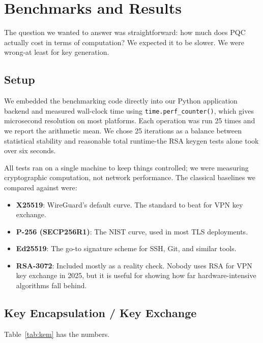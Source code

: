 \documentclass[10pt, conference, letterpaper]{IEEEtran}
\begin{document}
\section{Benchmarks and Results}
The question we wanted to answer was straightforward: how much does PQC actually cost in terms of computation? We expected it to be slower. We were wrong-at least for key generation.

\subsection{Setup}
We embedded the benchmarking code directly into our Python application backend and measured wall-clock time using \texttt{time.perf\_counter()}, which gives microsecond resolution on most platforms. Each operation was run 25 times and we report the arithmetic mean. We chose 25 iterations as a balance between statistical stability and reasonable total runtime-the RSA keygen tests alone took over six seconds.

All tests ran on a single machine to keep things controlled; we were measuring cryptographic computation, not network performance. The classical baselines we compared against were:
\begin{itemize}
    \item \textbf{X25519}: WireGuard's default curve. The standard to beat for VPN key exchange.
    \item \textbf{P-256 (SECP256R1)}: The NIST curve, used in most TLS deployments.
    \item \textbf{Ed25519}: The go-to signature scheme for SSH, Git, and similar tools.
    \item \textbf{RSA-3072}: Included mostly as a reality check. Nobody uses RSA for VPN key exchange in 2025, but it is useful for showing how far hardware-intensive algorithms fall behind.
\end{itemize}

\subsection{Key Encapsulation / Key Exchange}
Table~\ref{tab:kem} has the numbers.

\begin{table}[hbt!]
\centering
\caption{KEM / Key Exchange Performance (mean of 25 iterations)}
\label{tab:kem}
\end{table}
\end{document}
